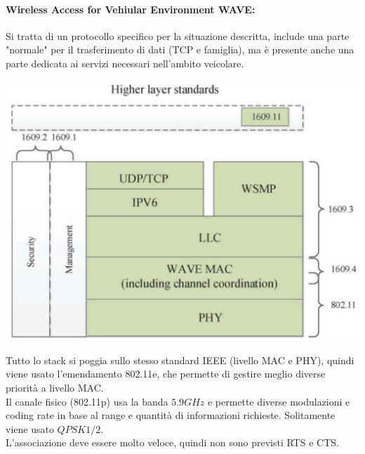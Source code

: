 \paragraph{Wireless Access for Vehiular Environment WAVE:} Si tratta di un protocollo specifico per la situazione descritta, include una parte "normale" per il trasferimento di dati (TCP e famiglia), ma è presente anche una parte dedicata ai servizi necessari nell'ambito veicolare.
\begin{center}
	\includegraphics[width=0.6\linewidth]{img/wlan/wave}
\end{center}

Tutto lo stack si poggia sullo stesso standard IEEE (livello MAC e PHY), quindi viene usato l'emendamento 802.11e, che permette di gestire meglio diverse priorità a livello MAC.\\

Il canale fisico (802.11p) usa la banda $5.9GHz$ e permette diverse modulazioni e coding rate in base al range e quantità di informazioni richieste. Solitamente viene usato $QPSK 1/2$.\\

L'associazione deve essere molto veloce, quindi non sono previsti RTS e CTS.\\

